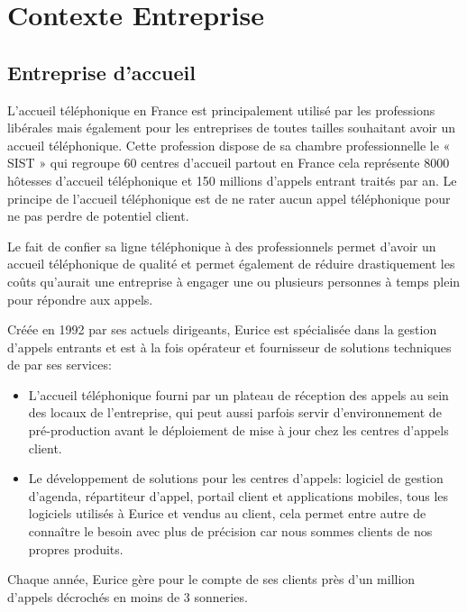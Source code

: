 \chapter{Contexte Entreprise}
\section{Entreprise d'accueil}
L’accueil téléphonique en France est principalement utilisé par les professions libérales 
mais également pour les entreprises de toutes tailles souhaitant avoir un accueil téléphonique.
Cette profession dispose de sa chambre professionnelle  le « SIST » qui regroupe 60 centres d’accueil partout en France cela représente 
8000 hôtesses d'accueil téléphonique et 150 millions d'appels entrant traités par an. 
Le principe de l’accueil téléphonique est de ne rater aucun appel téléphonique 
pour ne pas perdre de potentiel client. \newline

Le fait de confier sa ligne téléphonique à des professionnels 
permet d’avoir un accueil téléphonique de qualité et permet également de réduire drastiquement les coûts qu’aurait une entreprise à engager 
une ou plusieurs personnes à temps plein pour répondre aux appels.\newline

Créée en 1992 par ses actuels dirigeants, Eurice est spécialisée dans la gestion d'appels entrants 
et est à la fois opérateur et fournisseur de solutions techniques de par ses services:
\begin{itemize}
	\item L'accueil téléphonique fourni par un plateau de réception des appels 
	au sein des locaux de l'entreprise, qui peut aussi parfois servir d’environnement de pré-production 
	avant le déploiement de mise à jour chez les centres d'appels client.

	\item Le développement de solutions pour les centres d'appels: logiciel de gestion d'agenda, 
	répartiteur d'appel, portail client et applications mobiles, tous les logiciels utilisés à Eurice 
	et vendus au client, cela permet entre autre de connaître le besoin avec plus de précision 
	car nous sommes clients de nos propres produits.
\end{itemize}
Chaque année, Eurice gère pour le compte de ses clients près 
d'un million d'appels décrochés en moins de 3 sonneries.

